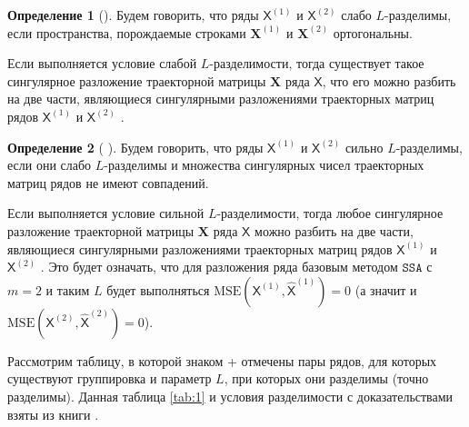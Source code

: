 \documentclass[12pt, specialist, subf
]{disser}
\theoremstyle{definition}
\newcommand{\SSA}{\texttt{SSA}}
\newcommand{\TS}{\mathsf{X}}
\newtheorem{definition}{Определение} %
\begin{document}
\begin{definition}[{\cite{golyandina2001analysis}}]
	Будем говорить, что ряды $\TS^{(1)}$ и $\TS^{(2)}$ слабо $L$-разделимы, если пространства, порождаемые строками $\mathbf{X}^{(1)}$ и $\mathbf{X}^{(2)}$ ортогональны.
\end{definition}

Если выполняется условие слабой $L$-разделимости, тогда существует такое сингулярное разложение траекторной матрицы $\mathbf X$ ряда $\TS$, что его можно разбить на две части, являющиеся сингулярными разложениями траекторных матриц рядов $\TS^{(1)}$ и $\TS^{(2)}$ \cite{golyandina2001analysis}.

\begin{definition}[{ \cite{golyandina2001analysis}}]
	Будем говорить, что ряды $\TS^{(1)}$ и $\TS^{(2)}$ сильно $L$-разделимы, если они слабо $L$-разделимы и множества сингулярных чисел траекторных матриц рядов не имеют совпадений.
\end{definition}

Если выполняется условие сильной $L$-разделимости, тогда любое сингулярное разложение траекторной матрицы $\mathbf X$ ряда $\TS$ можно разбить на две части, являющиеся сингулярными разложениями траекторных матриц рядов $\TS^{(1)}$ и $ \TS^{(2)}$ \cite{golyandina2001analysis}. Это будет означать, что для разложения ряда базовым методом $\SSA$ с $m = 2$ и таким $L$ будет выполняться
\( \mathrm{MSE}\left(\TS^{(1)}, \hat{\TS}^{(1)}\right) = 0 \) (а значит и \( \mathrm{MSE}\left(\TS^{(2)}, \hat{\TS}^{(2)}\right) = 0 \)).


Рассмотрим таблицу, в которой знаком + отмечены пары рядов, для которых существуют группировка и параметр $L$, при которых они разделимы (точно разделимы). Данная таблица \ref{tab:1} и условия разделимости с доказательствами взяты из книги \cite{golyandina2001analysis}.

\begin{table}[H]
	\begin{center}
		\caption{Точная разделимость.}
		\label{tab:1}
	\end{center}
\end{table}
\end{document}
